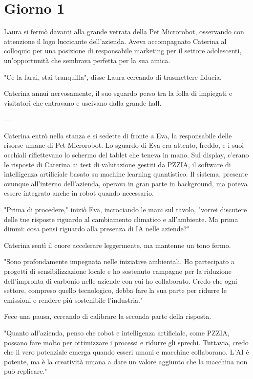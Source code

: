 \section{Giorno 1}

Laura si fermò davanti alla grande vetrata della Pet Microrobot, osservando con attenzione il logo luccicante dell'azienda. Aveva accompagnato Caterina al colloquio per una posizione di responsabile marketing per il settore adolescenti, un'opportunità che sembrava perfetta per la sua amica.

"Ce la farai, stai tranquilla", disse Laura cercando di trasmettere fiducia.

Caterina annuì nervosamente, il suo sguardo perso tra la folla di impiegati e visitatori che entravano e uscivano dalla grande hall.

---

Caterina entrò nella stanza e si sedette di fronte a Eva, la responsabile delle risorse umane di Pet Microrobot. Lo sguardo di Eva era attento, freddo, e i suoi occhiali riflettevano lo schermo del tablet che teneva in mano. Sul display, c'erano le risposte di Caterina ai test di valutazione gestiti da PZZIA, il software di intelligenza artificiale basato su machine learning quantistico. Il sistema, presente ovunque all'interno dell'azienda, operava in gran parte in background, ma poteva essere integrato anche in robot quando necessario.

"Prima di procedere," iniziò Eva, incrociando le mani sul tavolo, "vorrei discutere delle tue risposte riguardo al cambiamento climatico e all'ambiente. Ma prima dimmi: cosa pensi riguardo alla presenza di IA nelle aziende?"

Caterina sentì il cuore accelerare leggermente, ma mantenne un tono fermo.

"Sono profondamente impegnata nelle iniziative ambientali. Ho partecipato a progetti di sensibilizzazione locale e ho sostenuto campagne per la riduzione dell'impronta di carbonio nelle aziende con cui ho collaborato. Credo che ogni settore, compreso quello tecnologico, debba fare la sua parte per ridurre le emissioni e rendere più sostenibile l'industria."

Fece una pausa, cercando di calibrare la seconda parte della risposta.

"Quanto all'azienda, penso che robot e intelligenza artificiale, come PZZIA, possano fare molto per ottimizzare i processi e ridurre gli sprechi. Tuttavia, credo che il vero potenziale emerga quando esseri umani e macchine collaborano. L'AI è potente, ma è la creatività umana a dare un valore aggiunto che la macchina non può replicare."

